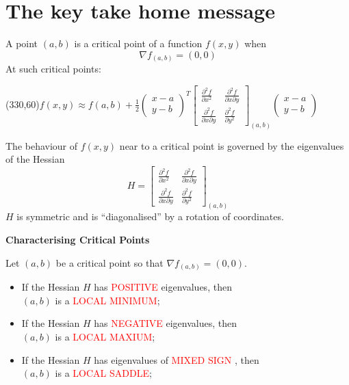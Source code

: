\documentclass{article}
\begin{document}
\newpage
\section{The key take home message}

A point $(a,b)$ is a critical point of a function $f(x,y)$ when
$$
\nabla f_{(a,b)} = (0,0)
$$
At such critical points:
\vspace{.5cm}

\framebox(330,60){$ f(x,y) \approx f(a,b) + \frac{1}{2} \left( \begin{array}{c} x-a\\y-b \end{array} \right)^T \left[ \begin{array}{cc}
\frac{\partial ^2 f}{\partial x ^2} & \frac{\partial ^2 f}{\partial x \partial y}\\\frac{\partial ^2 f}{\partial x \partial y} & \frac{\partial ^2 f}{\partial y ^2} \end{array} \right]_{(a,b)} \left( \begin{array}{c} x-a\\y-b \end{array} \right) $}

The behaviour of $f(x,y)$ near to a critical point is governed by the eigenvalues of the Hessian
$$
H = \left[ \begin{array}{cc}
\frac{\partial ^2 f}{\partial x ^2} & \frac{\partial ^2 f}{\partial x \partial y}\\\frac{\partial ^2 f}{\partial x \partial y} & \frac{\partial ^2 f}{\partial y ^2} \end{array} \right]_{(a,b)}  
$$
$H$ is symmetric and is ``diagonalised'' by a rotation of coordinates.


\textbf{Characterising Critical Points}

Let $(a, b)$ be a critical point so that $\nabla f_{(a,b)} = (0,0)$.
\begin{itemize}
\item
If the Hessian $H$ has \textcolor{red}{POSITIVE} eigenvalues, then
\\

$(a, b)$ is a  \textcolor{red}{LOCAL MINIMUM};
\item
If the Hessian $H$ has \textcolor{red}{NEGATIVE} eigenvalues, then
\\

$(a, b)$ is a  \textcolor{red}{LOCAL MAXIUM};
\item
If the Hessian $H$ has eigenvalues of \textcolor{red}{MIXED SIGN} , then
\\ 

$(a, b)$ is a  \textcolor{red}{LOCAL SADDLE};
\end{itemize}
\end{document}

